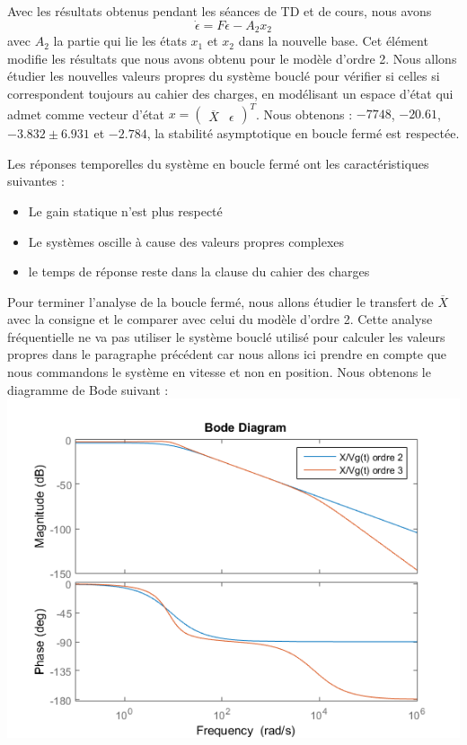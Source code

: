 Avec les résultats obtenus pendant les séances de TD et de cours, nous avons \begin{equation}\label{eqn:erreurRecompoOrdreSup}
\dot{\epsilon} = F\epsilon - A_2x_2
\end{equation}
avec $A_2$ la partie qui lie les états $x_1$ et $x_2$ dans la nouvelle base. Cet élément modifie les résultats que nous avons obtenu pour le modèle d'ordre 2. Nous allons étudier les nouvelles valeurs propres du système bouclé pour vérifier si celles si correspondent toujours au cahier des charges, en modélisant un espace d'état qui admet comme vecteur d'état $x=\begin{pmatrix}
\overline{X}&\epsilon \end{pmatrix}^T$. Nous obtenons : $-7748$, $-20.61$, $ -3.832 \pm 6.931$ et $-2.784$, la stabilité asymptotique en boucle fermé est respectée.


Les réponses temporelles du système en boucle fermé ont les caractéristiques suivantes : \begin{itemize}
\item Le gain statique n'est plus respecté
\item Le systèmes oscille à cause des valeurs propres complexes
\item le temps de réponse reste dans la clause du cahier des charges
\end{itemize}


Pour terminer l'analyse de la boucle fermé, nous allons étudier le transfert de $\overline{X}$ avec la consigne et le comparer avec celui du modèle d'ordre 2. Cette analyse fréquentielle ne va pas utiliser le système bouclé utilisé pour calculer les valeurs propres dans le paragraphe précédent car nous allons ici prendre en compte que nous commandons le système en vitesse et non en position. Nous obtenons le diagramme de Bode suivant :
\includegraphics[scale=1]{./III/figure/bode_Tpert_EE1.png}

